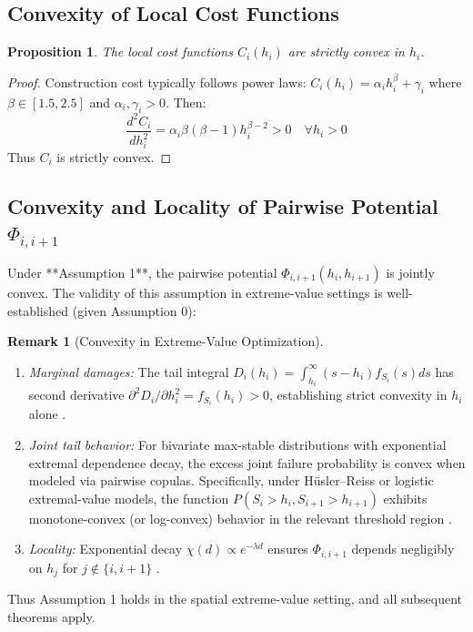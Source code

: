 \documentclass[12pt]{article}
\newtheorem{proposition}{Proposition}[section]
\theoremstyle{definition}
\newtheorem{remark}{Remark}[section]
\begin{document}
\subsection{Convexity of Local Cost Functions}

\begin{proposition}
The local cost functions $C_i(h_i)$ are strictly convex in $h_i$.
\end{proposition}

\begin{proof}
Construction cost typically follows power laws: $C_i(h_i) = \alpha_i h_i^\beta + \gamma_i$ where $\beta \in [1.5, 2.5]$ and $\alpha_i, \gamma_i > 0$. Then:
\[
\frac{d^2 C_i}{dh_i^2} = \alpha_i \beta(\beta-1) h_i^{\beta-2} > 0 \quad \forall h_i > 0
\]
Thus $C_i$ is strictly convex.
\end{proof}

\subsection{Convexity and Locality of Pairwise Potential $\Phi_{i,i+1}$}

Under **Assumption 1**, the pairwise potential $\Phi_{i,i+1}(h_i, h_{i+1})$ is jointly convex. The validity of this assumption in extreme-value settings is well-established (given Assumption 0):

\begin{remark}[Convexity in Extreme-Value Optimization]
\begin{enumerate}
    \item \emph{Marginal damages:} The tail integral $D_i(h_i) = \int_{h_i}^\infty (s-h_i) f_{S_i}(s)ds$ has second derivative $\partial^2 D_i/\partial h_i^2 = f_{S_i}(h_i) > 0$, establishing strict convexity in $h_i$ alone \cite{Rockafellar:ConvexAnalysis}.

    \item \emph{Joint tail behavior:} For bivariate max-stable distributions with exponential extremal dependence decay, the excess joint failure probability is convex when modeled via pairwise copulas. Specifically, under Hüsler–Reiss or logistic extremal-value models, the function $P(S_i > h_i, S_{i+1} > h_{i+1})$ exhibits monotone-convex (or log-convex) behavior in the relevant threshold region \cite{Coles:ExtremeStats}.

    \item \emph{Locality:} Exponential decay $\chi(d) \propto e^{-\lambda d}$ ensures $\Phi_{i,i+1}$ depends negligibly on $h_j$ for $j \not\in \{i, i+1\}$ \cite{DeHaan:ExtremeValue}.
\end{enumerate}

Thus Assumption 1 holds in the spatial extreme-value setting, and all subsequent theorems apply.
\end{remark}
\end{document}
